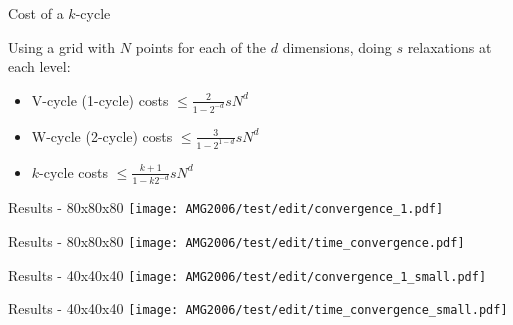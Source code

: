 \documentclass{beamer}
\begin{document}
\begin{frame}{Cost of a $k$-cycle}
 
 Using a grid with $N$ points for each of the $d$ dimensions, doing $s$ relaxations at each level:
 \begin{itemize}
  \item V-cycle (1-cycle) costs $\leq \frac{2}{1-2^{-d}} sN^d$
  \item W-cycle (2-cycle) costs $\leq \frac{3}{1-2^{1-d}} sN^d$
  \item $k$-cycle costs $\leq \frac{k+1}{1-k2^{-d}} sN^d$
 \end{itemize}
\end{frame}

\begin{frame}{Results - 80x80x80}
 \texttt{[image: AMG2006/test/edit/convergence\_1.pdf]}
\end{frame}
\begin{frame}{Results - 80x80x80}
 \texttt{[image: AMG2006/test/edit/time\_convergence.pdf]}
\end{frame}
\begin{frame}{Results - 40x40x40}
 \texttt{[image: AMG2006/test/edit/convergence\_1\_small.pdf]}
\end{frame}
\begin{frame}{Results - 40x40x40}
 \texttt{[image: AMG2006/test/edit/time\_convergence\_small.pdf]}
\end{frame}
\end{document}
